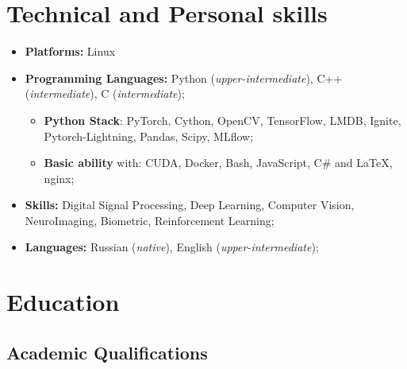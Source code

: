 \documentclass[10pt,a4paper,sans]{moderncv}
\begin{document}
\section{Technical and Personal skills}

\vspace{6pt}

\begin{itemize}

\item \textbf{Platforms:} Linux
\vspace{2pt}
\item \textbf{Programming Languages:} Python (\textit{upper-intermediate}), C++ (\textit{intermediate}), C (\textit{intermediate});
\begin{itemize}
	\item \textbf{Python Stack}: PyTorch, Cython, OpenCV, TensorFlow, LMDB, Ignite, Pytorch-Lightning, Pandas, Scipy, MLflow;
    \item \textbf{Basic ability} with: CUDA, Docker, Bash, JavaScript, C\# and \LaTeX, nginx;
\end{itemize}
\vspace{2pt}
\item \textbf{Skills:} Digital Signal Processing, Deep Learning, Computer Vision, NeuroImaging, Biometric, Reinforcement Learning;
\vspace{2pt}
\item \textbf{Languages:} Russian (\textit{native}), English (\textit{upper-intermediate});
\end{itemize}




\section{Education}

\vspace{5pt}

\subsection{Academic Qualifications}

\vspace{5pt}
\end{document}

